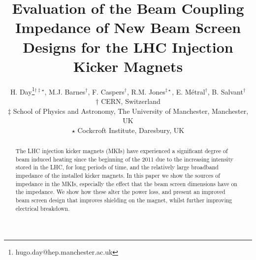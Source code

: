 \documentclass{JAC2003}
\begin{document}
\title{Evaluation of the Beam Coupling Impedance of New Beam Screen Designs for the LHC Injection Kicker Magnets}
\author{H. Day\thanks{hugo.day@hep.manchester.ac.uk}$^{\dagger\ddagger\star}$, M.J. Barnes$^{\dagger}$, F. Caspers$^{\dagger}$, R.M. Jones$^{\ddagger \star}$, E. Métral$^{\dagger}$, B. Salvant$^{\dagger}$ \\
$\dagger$ CERN, Switzerland \\
$\ddagger$ School of Physics and Astronomy, The University of Manchester, Manchester, UK \\
$\star$ Cockcroft Institute, Daresbury, UK \\}

\maketitle

\begin{abstract}
The LHC injection kicker magnets (MKIs) have experienced a significant degree of beam induced heating since the beginning of the 2011 due to the increasing intensity stored in the LHC, for long periods of time, and the relatively large broadband impedance of the installed kicker magnets. In this paper we show the sources of impedance in the MKIs, especially the effect that the beam screen dimensions have on the impedance. We show how these alter the power loss, and present an improved beam screen design that improves shielding on the magnet, whilst further improving electrical breakdown.
\end{abstract}


%
%
%
\end{document}
